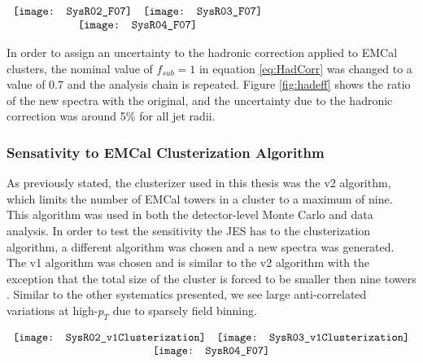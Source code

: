 \begin{figure*}[t!]
$\begin{array}{rl}
    \texttt{[image: SysR02\_F07]} &
    \texttt{[image: SysR03\_F07]}\\
    \multicolumn{2}{c}{\texttt{[image: SysR04\_F07]}}
\end{array}$
\caption[Systematic due to Hadronic correction.]{\label{fig:hadeff}Systematic due to hadronic correction efficiency; R = 0.2 \textit{(top left)}, R = 0.3 \textit{(top right)}, R = 0.4 \textit{(bottom)}.}
\end{figure*}

In order to assign an uncertainty to the hadronic correction applied to EMCal clusters, the nominal value of $f_{sub} = 1$ in equation \ref{eq:HadCorr} was changed to a value of 0.7 and the analysis chain is repeated.  Figure \ref{fig:hadeff} shows the ratio of the new spectra with the original, and the uncertainty due to the hadronic correction was around 5\% for all jet radii.

\subsubsection{Sensativity to EMCal Clusterization Algorithm}
As previously stated, the clusterizer used in this thesis was the v2 algorithm, which limits the number of EMCal towers in a cluster to a maximum of nine. This algorithm was used in both the detector-level Monte Carlo and data analysis.  In order to test the sensitivity the JES has to the clusterization algorithm, a different algorithm was chosen and a new spectra was generated.  The v1 algorithm was chosen and is similar to the v2 algorithm with the exception that the total size of the cluster is forced to be smaller then nine towers .  Similar to the other systematics presented, we see large anti-correlated variations at high-$p_{T}$ due to sparsely field binning.  

\begin{figure*}[t!]
$\begin{array}{rl}
    \texttt{[image: SysR02\_v1Clusterization]} &
    \texttt{[image: SysR03\_v1Clusterization]}\\
    \multicolumn{2}{c}{\texttt{[image: SysR04\_F07]}}
\end{array}$
\caption[Systematic due to clusterization algorithm.]{\label{fig:cluseff}Systematic due to EMCal clusterization algorithm; R = 0.2 \textit{(top left)}, R = 0.3 \textit{(top right)}, R = 0.4 \textit{(bottom)}.}
\end{figure*}

